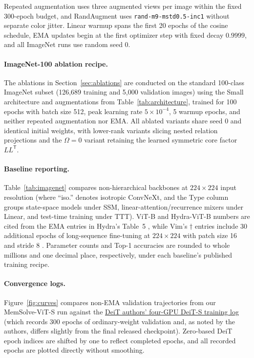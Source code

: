 \documentclass[10pt,twocolumn]{article}
\newcommand{\T}{\mathsf{T}}
\begin{document}
Repeated augmentation \cite{hoffer2020augment} uses three augmented views per
image within the fixed 300-epoch budget, and RandAugment
\cite{cubuk2020randaugment} uses \texttt{rand-m9-mstd0.5-inc1} without
separate color jitter.
Linear warmup spans the first 20 epochs of the cosine schedule, EMA updates
begin at the first optimizer step with fixed decay $0.9999$, and all ImageNet
runs use random seed 0.

\paragraph{ImageNet-100 ablation recipe.}
The ablations in Section~\ref{sec:ablations} are conducted on the standard
100-class ImageNet subset (126,689 training and 5,000 validation images)
\cite{tian2020cmc} using the Small architecture and augmentations from
Table~\ref{tab:architecture}, trained for 100 epochs with batch size 512, peak
learning rate $5\times10^{-4}$, 5 warmup epochs, and neither repeated
augmentation nor EMA.
All ablated variants share seed 0 and identical initial weights, with
lower-rank variants slicing nested relation projections and the $\Omega=0$
variant retaining the learned symmetric core factor $LL^\T$.

\paragraph{Baseline reporting.}
Table~\ref{tab:imagenet} compares non-hierarchical backbones at $224\times224$
input resolution (where ``iso.'' denotes isotropic ConvNeXt, and the Type
column groups state-space models under SSM, linear-attention/recurrence
mixers under Linear, and test-time training under TTT).
ViT-B and Hydra-ViT-B numbers are cited from the EMA entries in Hydra's
Table~5 \cite{hwang2024hydra}, while Vim's $\dagger$ entries include 30
additional epochs of long-sequence fine-tuning at $224\times224$ with patch
size 16 and stride 8 \cite{zhu2024vim}.
Parameter counts and Top-1 accuracies are rounded to whole millions and one
decimal place, respectively, under each baseline's published training recipe.

\paragraph{Convergence logs.}
Figure~\ref{fig:curves} compares non-EMA validation trajectories from our
MemSolve-ViT-S run against the
\href{https://gist.github.com/fmassa/0dbd0184a0adb904ef42277b487d8b53}{DeiT authors' four-GPU DeiT-S training log}
(which records 300 epochs of ordinary-weight validation and, as noted by the
authors, differs slightly from the final released checkpoint).
Zero-based DeiT epoch indices are shifted by one to reflect completed epochs,
and all recorded epochs are plotted directly without smoothing.
\end{document}
